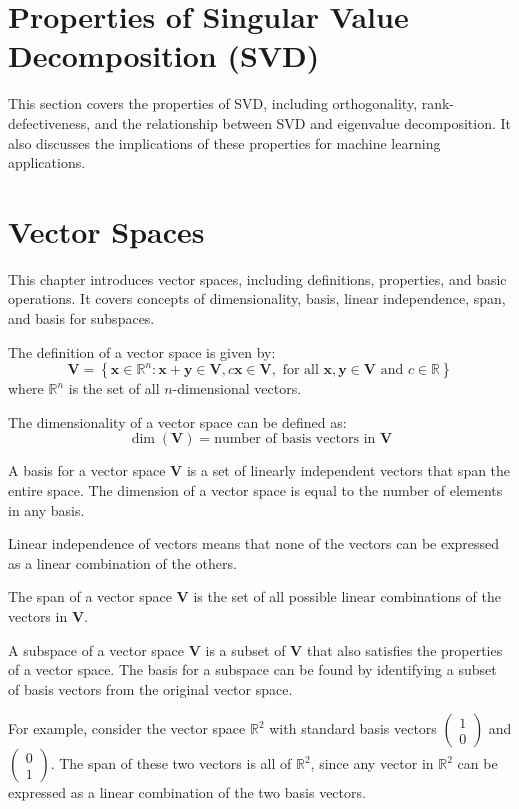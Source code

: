 \documentclass{report}%
\begin{document}
%
%
\section{Properties of Singular Value Decomposition (SVD)}%
This section covers the properties of SVD, including orthogonality, rank-defectiveness, and the relationship between SVD and eigenvalue decomposition. It also discusses the implications of these properties for machine learning applications.

%
\section*{Vector Spaces}

This chapter introduces vector spaces, including definitions, properties, and basic operations. It covers concepts of dimensionality, basis, linear independence, span, and basis for subspaces.

The definition of a vector space is given by:
\[
 \mathbf{V} = \left\{ \mathbf{x} \in \mathbb{R}^n : \mathbf{x} + \mathbf{y} \in \mathbf{V}, c\mathbf{x} \in \mathbf{V}, \text{ for all } \mathbf{x}, \mathbf{y} \in \mathbf{V} \text{ and } c \in \mathbb{R} \right\}
\]
where $\mathbb{R}^n$ is the set of all $n$-dimensional vectors.

The dimensionality of a vector space can be defined as:
\[
\dim(\mathbf{V}) = \text{number of basis vectors in }\mathbf{V}
\]

A basis for a vector space $\mathbf{V}$ is a set of linearly independent vectors that span the entire space. The dimension of a vector space is equal to the number of elements in any basis.

Linear independence of vectors means that none of the vectors can be expressed as a linear combination of the others.

The span of a vector space $\mathbf{V}$ is the set of all possible linear combinations of the vectors in $\mathbf{V}$.

A subspace of a vector space $\mathbf{V}$ is a subset of $\mathbf{V}$ that also satisfies the properties of a vector space. The basis for a subspace can be found by identifying a subset of basis vectors from the original vector space.

For example, consider the vector space $\mathbb{R}^2$ with standard basis vectors $\begin{pmatrix} 1 \\ 0 \end{pmatrix}$ and $\begin{pmatrix} 0 \\ 1 \end{pmatrix}$. The span of these two vectors is all of $\mathbb{R}^2$, since any vector in $\mathbb{R}^2$ can be expressed as a linear combination of the two basis vectors.
\end{document}
